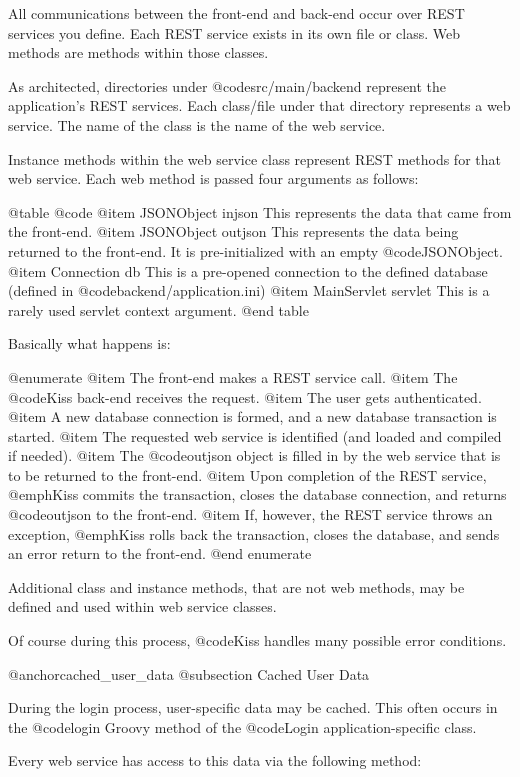 All communications between the front-end and back-end occur over REST
services you define.  Each REST service exists in its own
file or class.  Web methods are methods within those classes.

As architected, directories under @code{src/main/backend}
represent the application's REST services.  Each class/file under that
directory represents a web service.  The name of the class is the name
of the web service.

Instance methods within the web service class represent REST methods
for that web service.  Each web method is passed four arguments as follows:

@table @code
@item JSONObject injson
This represents the data that came from the front-end.
@item JSONObject outjson
This represents the data being returned to the front-end.  It is pre-initialized with an empty @code{JSONObject}.
@item Connection db
This is a pre-opened connection to the defined database (defined in @code{backend/application.ini})
@item MainServlet servlet
This is a rarely used servlet context argument.
@end table

Basically what happens is:

@enumerate
@item
The front-end makes a REST service call.
@item
The @code{Kiss} back-end receives the request.
@item
The user gets authenticated.
@item
A new database connection is formed, and a new database transaction is started.
@item
The requested web service is identified (and loaded and compiled if needed).
@item
The @code{outjson} object is filled in by the web service that is to be returned to the front-end.
@item
Upon completion of the REST service, @emph{Kiss} commits the transaction, closes the database connection, and returns @code{outjson} to the front-end.
@item
If, however, the REST service throws an exception, @emph{Kiss} rolls back the transaction, closes the database, and sends an error return to the front-end.
@end enumerate

Additional class and instance methods, that are not web methods, may
be defined and used within web service classes.

Of course during this process, @code{Kiss} handles many possible error conditions.

@anchor{cached_user_data}
@subsection Cached User Data

During the login process, user-specific data may be cached.  This
often occurs in the @code{login} Groovy method of the @code{Login}
application-specific class.

Every web service has access to this data via the following method:

